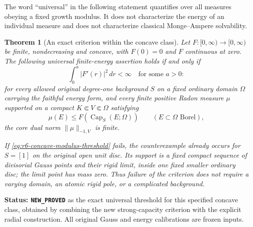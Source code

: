 \documentclass[11pt,a4paper]{article}
\numberwithin{equation}{section}
\newtheorem{theorem}{Theorem}[section]
\theoremstyle{definition}
\theoremstyle{remark}
\begin{document}
The word ``universal'' in the following statement quantifies over all
measures obeying a fixed growth modulus. It does not characterize the
energy of an individual measure and does not characterize classical
Monge--Ampere solvability.

\begin{theorem}[An exact criterion within the concave class]
\label{thm:r6-concave-modulus-threshold}
Let $F:[0,\infty)\to[0,\infty)$ be finite, nondecreasing and
concave, with $F(0)=0$ and $F$ continuous at zero. The following
universal finite-energy assertion holds if and only if
\begin{equation}
                         \int_0^a |F'(r)|^2\,dr<\infty
                         \quad\text{for some }a>0:
 \label{eq:r6-concave-modulus-threshold}
\end{equation}
for every allowed original degree-one background $S$ on a fixed
ordinary domain $\Omega$ carrying the faithful energy form, and
every finite positive Radon measure $\mu$ supported on a compact
$K\Subset V\Subset\Omega$ satisfying
\[
        \mu(E)\le F(\operatorname{Cap}_S(E;\Omega))
                       \qquad(E\subset\Omega\text{ Borel}),
\]
the core dual norm $\|\mu\|_{-1,V}$ is finite.

If \eqref{eq:r6-concave-modulus-threshold} fails, the counterexample
already occurs for $S=[1]$ on the original open unit disc. Its support
is a fixed compact sequence of divisorial Gauss points and their
rigid limit, inside one fixed smaller ordinary disc; the limit
point has mass zero. Thus failure of the criterion does not require
a varying domain, an atomic rigid pole, or a complicated background.
\end{theorem}

\noindent\textbf{Status: \texttt{NEW\_PROVED}} as the exact universal
threshold for this specified concave class, obtained by combining the
new strong-capacity criterion with the explicit radial construction.
All original Gauss and energy calibrations are frozen inputs.
\end{document}

